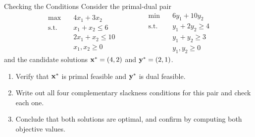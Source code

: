 \begin{ex}{Checking the Conditions}{}
\label{ex:cs-warmup-check}
 Consider the primal-dual pair
\[
\begin{aligned}
\max \quad & 4x_1 + 3x_2 \\
\text{s.t.} \quad & x_1 + x_2 \leq 6 \\
& 2x_1 + x_2 \leq 10 \\
& x_1, x_2 \geq 0
\end{aligned}
\qquad\qquad
\begin{aligned}
\min \quad & 6y_1 + 10y_2 \\
\text{s.t.} \quad & y_1 + 2y_2 \geq 4 \\
& y_1 + y_2 \geq 3 \\
& y_1, y_2 \geq 0
\end{aligned}
\]
and the candidate solutions $\mathbf{x}^* = (4, 2)$ and $\mathbf{y}^* = (2, 1)$.
\begin{enumerate}
\item Verify that $\mathbf{x}^*$ is primal feasible and $\mathbf{y}^*$ is dual feasible.
\item Write out all four complementary slackness conditions for this pair and check each one.
\item Conclude that both solutions are optimal, and confirm by computing both objective values.
\end{enumerate}
\end{ex}


